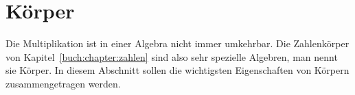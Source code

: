 %
%
%
\section{Körper
\label{buch:section:koerper}}
Die Multiplikation ist in einer Algebra nicht immer umkehrbar.
Die Zahlenkörper von Kapitel~\ref{buch:chapter:zahlen} sind also
sehr spezielle Algebren, man nennt sie Körper.
In diesem Abschnitt sollen die wichtigsten Eigenschaften von Körpern
zusammengetragen werden.






